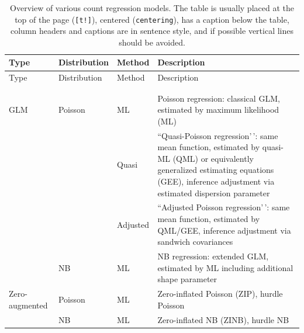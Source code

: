 \documentclass[
  nojss,
  article]{jss}
\begin{document}
\begin{longtable}[]{@{}
  >{\raggedright\arraybackslash}p{}
  >{\raggedright\arraybackslash}p{}
  >{\raggedright\arraybackslash}p{}
  >{\raggedright\arraybackslash}p{}@{}}
\toprule\noalign{}
\begin{minipage}[b]{\linewidth}\raggedright
Type
\end{minipage} & \begin{minipage}[b]{\linewidth}\raggedright
Distribution
\end{minipage} & \begin{minipage}[b]{\linewidth}\raggedright
Method
\end{minipage} & \begin{minipage}[b]{\linewidth}\raggedright
Description
\end{minipage} \\
\midrule\noalign{}
\endfirsthead
\toprule\noalign{}
\begin{minipage}[b]{\linewidth}\raggedright
Type
\end{minipage} & \begin{minipage}[b]{\linewidth}\raggedright
Distribution
\end{minipage} & \begin{minipage}[b]{\linewidth}\raggedright
Method
\end{minipage} & \begin{minipage}[b]{\linewidth}\raggedright
Description
\end{minipage} \\
\midrule\noalign{}
\endhead
\bottomrule\noalign{}
\tabularnewline
\caption{Overview of various count regression models. The table is
usually placed at the top of the page (\texttt{{[}t!{]}}), centered
(\texttt{centering}), has a caption below the table, column headers and
captions are in sentence style, and if possible vertical lines should be
avoided.}\label{tbl-overview}\tabularnewline
\endlastfoot
GLM & Poisson & ML & Poisson regression: classical GLM, estimated by
maximum likelihood (ML) \\
& & Quasi & ``Quasi-Poisson regression'\,': same mean function,
estimated by quasi-ML (QML) or equivalently generalized estimating
equations (GEE), inference adjustment via estimated dispersion
parameter \\
& & Adjusted & ``Adjusted Poisson regression'\,': same mean function,
estimated by QML/GEE, inference adjustment via sandwich covariances \\
& NB & ML & NB regression: extended GLM, estimated by ML including
additional shape parameter \\
Zero-augmented & Poisson & ML & Zero-inflated Poisson (ZIP), hurdle
Poisson \\
& NB & ML & Zero-inflated NB (ZINB), hurdle NB \\
\end{longtable}
\end{document}
